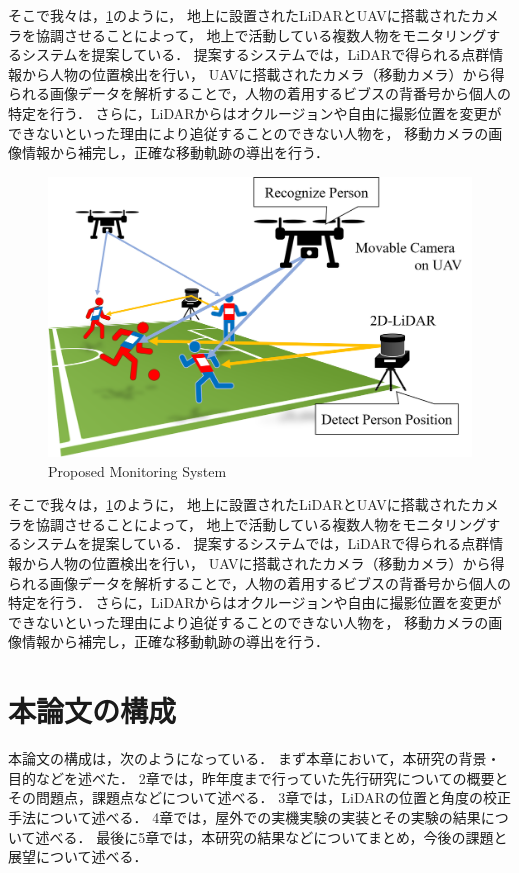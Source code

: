\documentclass[autodetect-engine,dvipdfmx-if-dvi,ja=standard,a4j,jbase=11pt,magstyle=nomag*]{bxjsreport}
\begin{document}
そこで我々は，\cref{fig:proposed_system}のように，
地上に設置されたLiDARとUAVに搭載されたカメラを協調させることによって，
地上で活動している複数人物をモニタリングするシステムを提案している．
提案するシステムでは，LiDARで得られる点群情報から人物の位置検出を行い，
UAVに搭載されたカメラ（移動カメラ）から得られる画像データを解析することで，人物の着用するビブスの背番号から個人の特定を行う．
さらに，LiDARからはオクルージョンや自由に撮影位置を変更ができないといった理由により追従することのできない人物を，
移動カメラの画像情報から補完し，正確な移動軌跡の導出を行う．

\begin{figure}[t]
    \centering
    \includegraphics[width=\linewidth, clip]{./figure/chapter1/proposed_method.png}
    \caption{Proposed Monitoring System}
    \label{fig:proposed_system}
\end{figure}

そこで我々は，\cref{fig:proposed_system}のように，
地上に設置されたLiDARとUAVに搭載されたカメラを協調させることによって，
地上で活動している複数人物をモニタリングするシステムを提案している．
提案するシステムでは，LiDARで得られる点群情報から人物の位置検出を行い，
UAVに搭載されたカメラ（移動カメラ）から得られる画像データを解析することで，人物の着用するビブスの背番号から個人の特定を行う．
さらに，LiDARからはオクルージョンや自由に撮影位置を変更ができないといった理由により追従することのできない人物を，
移動カメラの画像情報から補完し，正確な移動軌跡の導出を行う．



\section{本論文の構成}
本論文の構成は，次のようになっている．
まず本章において，本研究の背景・目的などを述べた．
2章では，昨年度まで行っていた先行研究についての概要とその問題点，課題点などについて述べる．
3章では，LiDARの位置と角度の校正手法について述べる．
4章では，屋外での実機実験の実装とその実験の結果について述べる．
最後に5章では，本研究の結果などについてまとめ，今後の課題と展望について述べる．
\end{document}
